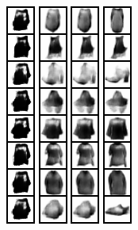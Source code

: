 \begin{figure}[]
{\includegraphics[width=0.06\columnwidth]{figures/FashionMNIST_evolution/train_image_6.png}
\includegraphics[width=0.06\columnwidth]{figures/FashionMNIST_evolution/train_image_8.png}
\includegraphics[width=0.06\columnwidth]{figures/FashionMNIST_evolution/train_image_10.png}
\includegraphics[width=0.06\columnwidth]{figures/FashionMNIST_evolution/train_image_20.png}
}
\end{figure}
